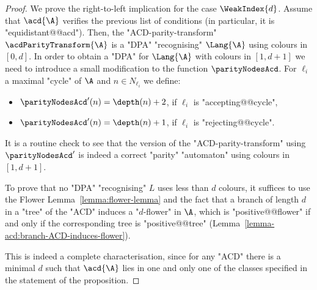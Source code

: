 \documentclass[10pt,a4paper]{amsart}
\begin{document}
\begin{proof}
	We prove the right-to-left implication for the case $\WeakIndex{d}$.
	Assume that $\acd{\A}$ verifies the previous list of conditions (in particular, it is "equidistant@@acd"). Then, the "ACD-parity-transform" $\acdParityTransform{\A}$ is a "DPA" "recognising" $\Lang{\A}$ using colours in $[0,d]$. In order to obtain a "DPA" for $\Lang{\A}$ with colours in $[1,d+1]$ we need to introduce a small modification to the function $\parityNodesAcd$. For $\ell_i$ a maximal "cycle" of $\A$ and $n\in N_{\ell_i}$ we define: \begin{itemize}
		\item $\parityNodesAcd'(n) = \depth(n)+2$, if $\ell_i$ is "accepting@@cycle",
		\item $\parityNodesAcd'(n) = \depth(n) + 1$, if $\ell_i$ is "rejecting@@cycle".
	\end{itemize}
	It is a routine check to see that the version of the "ACD-parity-transform" using $\parityNodesAcd'$ is indeed a correct "parity" "automaton" using colours in $[1,d+1]$.
	
	To prove that no "DPA" "recognising" $L$ uses less than $d$ colours, it suffices to use the Flower Lemma~\ref{lemma:flower-lemma} and the fact that a branch of length $d$ in a "tree" of the "ACD" induces a "$d$-flower" in $\A$, which is "positive@@flower" if and only if the corresponding tree is "positive@@tree" (Lemma~\ref{lemma-acd:branch-ACD-induces-flower}).
	
	This is indeed a complete characterisation, since for any "ACD" there is a minimal $d$ such that $\acd{\A}$ lies in one and only one of the classes specified in the statement of the proposition.
\end{proof}
\end{document}
